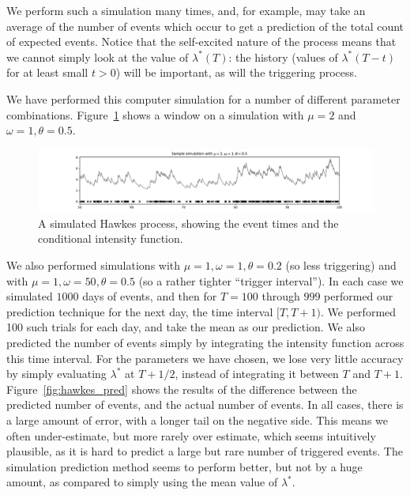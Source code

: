 \documentclass[twoside,a4paper]{article}
\theoremstyle{plain}
\theoremstyle{definition}
\begin{document}
We perform such a simulation many times, and, for example, may take an average of the number
of events which occur to get a prediction of the total count of expected events.  Notice
that the self-excited nature of the process means that we cannot simply look at the
value of $\lambda^*(T)$: the history (values of $\lambda^*(T-t)$ for at least small $t>0$)
will be important, as will the triggering process.

We have performed this computer simulation for a number of different parameter combinations.
Figure~\ref{fig:hawkes_sample} shows a window on a simulation with $\mu=2$ and $\omega=1,
\theta=0.5$.

\begin{figure}
  \includegraphics[width=\textwidth]{../notebooks/hawkes_sample.pdf}
  \caption{A simulated Hawkes process, showing the event times and the conditional intensity
function.}
  \label{fig:hawkes_sample}
\end{figure}

We also performed simulations with $\mu=1,\omega=1,\theta=0.2$ (so less triggering) and
with $\mu=1,\omega=50,\theta=0.5$ (so a rather tighter ``trigger interval'').  In each case
we simulated $1000$ days of events, and then for $T=100$ through $999$ performed our prediction
technique for the next day, the time interval $[T,T+1)$.  We performed 100 such trials for
each day, and take the mean as our prediction.  We also predicted the number of
events simply by integrating the intensity function across this time interval.  For the
parameters we have chosen, we lose very little accuracy by simply evaluating $\lambda^*$ at
$T+1/2$, instead of integrating it between $T$ and $T+1$.
Figure~\ref{fig:hawkes_pred} shows the results of the difference between the predicted
number of events, and the actual number of events.  In all cases, there is a large amount
of error, with a longer tail on the negative side.  This means we often under-estimate, but
more rarely over estimate, which seems intuitively plausible, as it is hard to predict a
large but rare number of triggered events.  The simulation prediction method seems to
perform better, but not by a huge amount, as compared to simply using the mean value
of $\lambda^*$.
\end{document}
